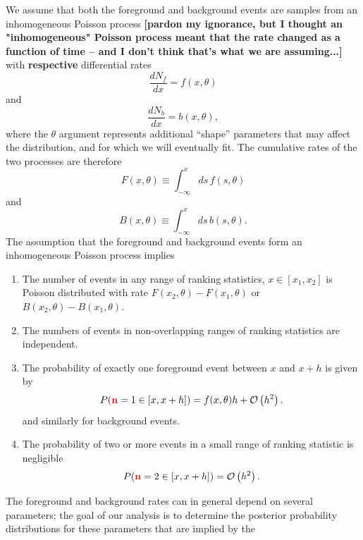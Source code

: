 \documentclass[aps,prd]{revtex4-1}
\newcommand{\order}[1]{\mathcal{O}\left( #1 \right)}
\newcommand{\ilya}[1]{{\color{red} \bf #1}}
\begin{document}
We assume that both the foreground and background events are samples
from an inhomogeneous Poisson process \ilya{[pardon my ignorance, but
    I thought an "inhomogeneous" Poisson process meant that the rate
    changed as a function of time -- and I don't think that's what we
    are assuming...]} with \ilya{respective} differential rates
\begin{equation}
  \frac{dN_f}{dx} = f(x, \theta)
\end{equation}
and 
\begin{equation}
  \frac{dN_b}{dx} = b(x, \theta),
\end{equation}
where the $\theta$ argument represents additional ``shape'' parameters
that may affect the distribution, and for which we will eventually
fit.  The cumulative rates of the two processes are therefore
\begin{equation}
  F(x,\theta) \equiv \int_{-\infty}^x ds\, f(s, \theta)
\end{equation}
and
\begin{equation}
  B(x,\theta) \equiv \int_{-\infty}^x ds\, b(s,\theta).
\end{equation}
The assumption that the foreground and background events form an
inhomogeneous Poisson process implies
\begin{enumerate}
\item \label{prop:Poisson} The number of events in any range of
  ranking statistics, $x \in [x_1, x_2]$ is Poisson distributed with
  rate $F(x_2, \theta) - F(x_1,\theta)$ or $B(x_2,\theta) -
  B(x_1,\theta)$.
\item The numbers of events in non-overlapping ranges of ranking
  statistics are independent. 
\item The probability of exactly one foreground event between $x$ and
  $x+h$ is given by
  \begin{equation}
    P(\ilya{n} = 1 \in [x, x+h]) = f(x,\theta) h + \order{h^2}.
  \end{equation}
  and similarly for background events.
\item The probability of two or more events in a small range of
  ranking statistic is negligible
  \begin{equation}
    P(\ilya{n} = 2 \in [x, x+h]) = \order{h^2}.
  \end{equation}
\end{enumerate}
The foreground and background rates can in general depend on several
parameters; the goal of our analysis is to determine the posterior
probability distributions for these parameters that are implied by the
\end{document}
